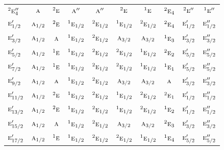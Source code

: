 \documentclass[10pt,a4paper]{article}
\numberwithin{equation}{section}
\newcommand{\irr}[1]{\text{\normalfont\scshape #1}}
\newcommand{\conjpair}[1]{{}^{#1}}
\begin{document}
{\begin{longtable}{@{}lccccccccc@{}}
$\conjpair{2}\irr{e}_{4}''$ & $\irr{a}$ & $\conjpair{2}\irr{e}$ & $\irr{a}''$ & $\irr{a}''$ & $\conjpair{2}\irr{e}$ & $\conjpair{1}\irr{e}$ & $\conjpair{2}\irr{e}_{4}$ & $\conjpair{2}\irr{e}''$ & $\conjpair{1}\irr{e}''$\\
$\irr{e}_{1/2}'$ & $\irr{a}_{1/2}$ & $\conjpair{2}\irr{e}$ & $\conjpair{1}\irr{e}_{1/2}$ & $\conjpair{2}\irr{e}_{1/2}$ & $\conjpair{1}\irr{e}_{1/2}$ & $\conjpair{2}\irr{e}_{1/2}$ & $\conjpair{2}\irr{e}_{4}$ & $\irr{e}_{1/2}'$ & $\irr{e}_{1/2}''$\\
$\irr{e}_{3/2}'$ & $\irr{a}_{1/2}$ & $\irr{a}$ & $\conjpair{1}\irr{e}_{1/2}$ & $\conjpair{2}\irr{e}_{1/2}$ & $\irr{a}_{3/2}$ & $\irr{a}_{3/2}$ & $\conjpair{1}\irr{e}_{3}$ & $\irr{e}_{3/2}'$ & $\irr{e}_{3/2}''$\\
$\irr{e}_{5/2}'$ & $\irr{a}_{1/2}$ & $\conjpair{1}\irr{e}$ & $\conjpair{1}\irr{e}_{1/2}$ & $\conjpair{2}\irr{e}_{1/2}$ & $\conjpair{2}\irr{e}_{1/2}$ & $\conjpair{1}\irr{e}_{1/2}$ & $\conjpair{2}\irr{e}_{2}$ & $\irr{e}_{5/2}'$ & $\irr{e}_{5/2}''$\\
$\irr{e}_{7/2}'$ & $\irr{a}_{1/2}$ & $\conjpair{1}\irr{e}$ & $\conjpair{1}\irr{e}_{1/2}$ & $\conjpair{2}\irr{e}_{1/2}$ & $\conjpair{2}\irr{e}_{1/2}$ & $\conjpair{1}\irr{e}_{1/2}$ & $\conjpair{1}\irr{e}_{1}$ & $\irr{e}_{5/2}'$ & $\irr{e}_{5/2}''$\\
$\irr{e}_{9/2}'$ & $\irr{a}_{1/2}$ & $\irr{a}$ & $\conjpair{1}\irr{e}_{1/2}$ & $\conjpair{2}\irr{e}_{1/2}$ & $\irr{a}_{3/2}$ & $\irr{a}_{3/2}$ & $\irr{a}$ & $\irr{e}_{3/2}'$ & $\irr{e}_{3/2}''$\\
$\irr{e}_{11/2}'$ & $\irr{a}_{1/2}$ & $\conjpair{2}\irr{e}$ & $\conjpair{1}\irr{e}_{1/2}$ & $\conjpair{2}\irr{e}_{1/2}$ & $\conjpair{1}\irr{e}_{1/2}$ & $\conjpair{2}\irr{e}_{1/2}$ & $\conjpair{2}\irr{e}_{1}$ & $\irr{e}_{1/2}'$ & $\irr{e}_{1/2}''$\\
$\irr{e}_{13/2}'$ & $\irr{a}_{1/2}$ & $\conjpair{2}\irr{e}$ & $\conjpair{1}\irr{e}_{1/2}$ & $\conjpair{2}\irr{e}_{1/2}$ & $\conjpair{1}\irr{e}_{1/2}$ & $\conjpair{2}\irr{e}_{1/2}$ & $\conjpair{1}\irr{e}_{2}$ & $\irr{e}_{1/2}'$ & $\irr{e}_{1/2}''$\\
$\irr{e}_{15/2}'$ & $\irr{a}_{1/2}$ & $\irr{a}$ & $\conjpair{1}\irr{e}_{1/2}$ & $\conjpair{2}\irr{e}_{1/2}$ & $\irr{a}_{3/2}$ & $\irr{a}_{3/2}$ & $\conjpair{2}\irr{e}_{3}$ & $\irr{e}_{3/2}'$ & $\irr{e}_{3/2}''$\\
$\irr{e}_{17/2}'$ & $\irr{a}_{1/2}$ & $\conjpair{1}\irr{e}$ & $\conjpair{1}\irr{e}_{1/2}$ & $\conjpair{2}\irr{e}_{1/2}$ & $\conjpair{2}\irr{e}_{1/2}$ & $\conjpair{1}\irr{e}_{1/2}$ & $\conjpair{1}\irr{e}_{4}$ & $\irr{e}_{5/2}'$ & $\irr{e}_{5/2}''$\\

\end{longtable}}
\end{document}

